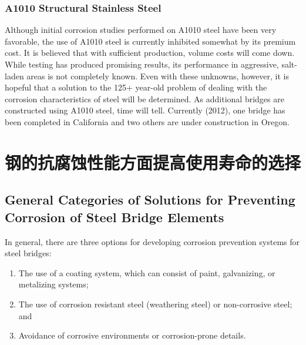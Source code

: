 \subsubsection{A1010 Structural Stainless Steel}
Although initial corrosion studies performed on A1010 steel have been very favorable, the use of A1010 steel is
currently inhibited somewhat by its premium cost. It is believed that with sufficient production, volume costs will
come down. While testing has produced promising results, its performance in aggressive, salt-laden areas is not
completely known. Even with these unknowns, however, it is hopeful that a solution to the 125+ year-old problem of
dealing with the corrosion characteristics of steel will be determined. As additional bridges are constructed using
A1010 steel, time will tell. Currently (2012), one bridge has been completed in California and two others are under
construction in Oregon.

\section{钢的抗腐蚀性能方面提高使用寿命的选择}

\subsection{General Categories of Solutions for Preventing Corrosion of Steel Bridge Elements}
\label{subsec:category-solution-prevent-corrosion-steel}
In general, there are three options for developing corrosion prevention systems for steel bridges:
\begin{enumerate}
  \item The use of a coating system, which can consist of paint, galvanizing, or metalizing systems;
  \item The use of corrosion resistant steel (weathering steel) or non-corrosive steel; and
  \item Avoidance of corrosive environments or corrosion-prone details.
\end{enumerate}
